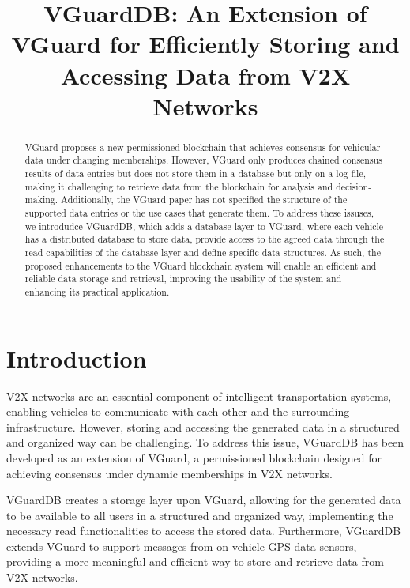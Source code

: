 \usepackage{filecontents}




\title{VGuardDB: An Extension of VGuard for Efficiently Storing and Accessing Data from V2X Networks}

\maketitle

\begin{abstract}
VGuard proposes a new permissioned blockchain that achieves consensus for vehicular data under changing memberships. However, VGuard only produces chained consensus results of data entries but does not store them in a database but only on a log file, making it challenging to retrieve data from the blockchain for analysis and decision-making. Additionally, the VGuard paper has not specified the structure of the supported data entries or the use cases that generate them. To address these issuses, we introdudce VGuardDB, which adds a database layer to VGuard, where each vehicle has a distributed database to store data, provide access to the agreed data through the read capabilities of the database layer and define specific data structures. As such, the proposed enhancements to the VGuard blockchain system will enable an efficient and reliable data storage and retrieval, improving the usability of the system and enhancing its practical application.
\end{abstract}
\section{Introduction}
V2X networks are an essential component of intelligent transportation systems, enabling vehicles to communicate with each other and the surrounding infrastructure. However, storing and accessing the generated data in a structured and organized way can be challenging. To address this issue, VGuardDB has been developed as an extension of VGuard, a permissioned blockchain designed for achieving consensus under dynamic memberships in V2X networks.

VGuardDB creates a storage layer upon VGuard, allowing for the generated data to be available to all users in a structured and organized way, implementing the necessary read functionalities to access the stored data. Furthermore, VGuardDB extends VGuard to support messages from on-vehicle GPS data sensors, providing a more meaningful and efficient way to store and retrieve data from V2X networks.

